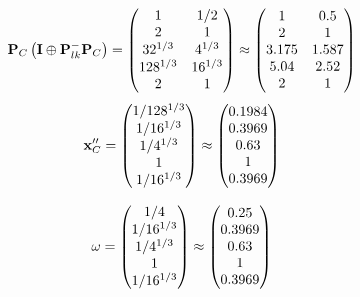 \documentclass[10pt,a4paper]{article}
\begin{document}
	\[
		\bold{P}_{C}\left(\bold{I} \oplus \bold{P}_{lk}^{-}\bold{P}_{C}\right) = 
		\begin{pmatrix}
			{1}{} & {1} / {{2}} \\
			{{2}}{} & {1}{} \\
			{{32^ {1 / 3}}}{} & {{4^ {1 / 3}}}{} \\
			{{128^ {1 / 3}}}{} & {{16^ {1 / 3}}}{} \\
			{{2}}{} & {1}{} \\
		\end{pmatrix}
		\approx
		\begin{pmatrix}
			1        & 0.5      \\
			2        & 1        \\
			3.175    & 1.587    \\
			5.04     & 2.52     \\
			2        & 1        \\
		\end{pmatrix}
	\]
	\[
		\bold{x}''_{C} = 
		\begin{pmatrix}
			{1} / {{128^ {1 / 3}}} \\
			{1} / {{16^ {1 / 3}}} \\
			{1} / {{4^ {1 / 3}}} \\
			{1}{} \\
			{1} / {{16^ {1 / 3}}} \\
		\end{pmatrix}
		\approx
		\begin{pmatrix}
			0.1984   \\
			0.3969   \\
			0.63     \\
			1        \\
			0.3969   \\
		\end{pmatrix}
	\]

	\[
		\bold{\omega} = 
		\begin{pmatrix}
			{1} / {{4}} \\
			{1} / {{16^ {1 / 3}}} \\
			{1} / {{4^ {1 / 3}}} \\
			{1}{} \\
			{1} / {{16^ {1 / 3}}} \\
		\end{pmatrix}
		\approx
		\begin{pmatrix}
			0.25     \\
			0.3969   \\
			0.63     \\
			1        \\
			0.3969   \\
		\end{pmatrix}
	\]
\end{document}
